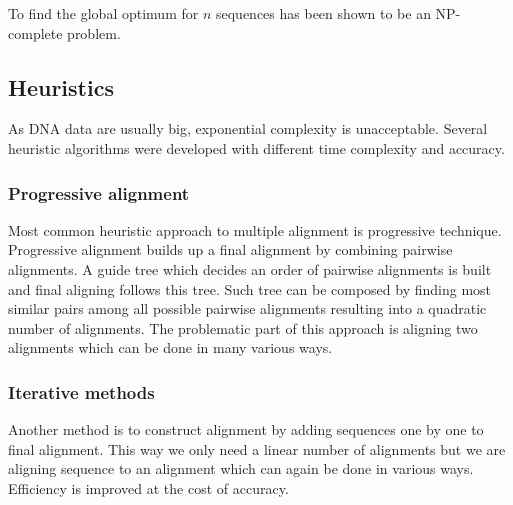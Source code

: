 To find the global optimum for $n$ sequences has been shown to be an NP-complete problem.\cite{wang1994complexity}

\subsection{Heuristics}
As DNA data are usually big, exponential complexity is unacceptable.
Several heuristic algorithms were developed with different time complexity and accuracy.

\subsubsection{Progressive alignment}
Most common heuristic approach to multiple alignment is progressive technique.
Progressive alignment builds up a final alignment by combining pairwise alignments.
A guide tree which decides an order of pairwise alignments is built and final aligning follows this tree.
Such tree can be composed by finding most similar pairs among all possible pairwise alignments resulting into
a quadratic number of alignments.
The problematic part of this approach is aligning two alignments which can be done in many various ways.

\subsubsection{Iterative methods}
Another method is to construct alignment by adding sequences one by one to final alignment.
This way we only need a linear number of alignments but we are aligning sequence to an alignment which can again be done in various ways.
Efficiency is improved at the cost of accuracy.
